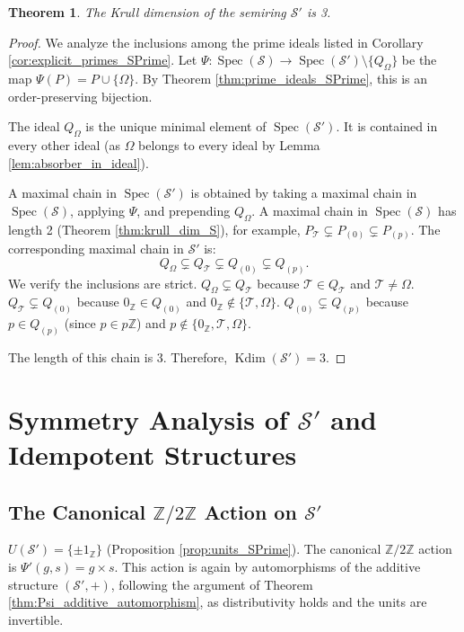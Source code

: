 \documentclass[11pt, a4paper]{article}
\theoremstyle{plain}
\newtheorem{theorem}{Theorem}[section]
\theoremstyle{definition}
\numberwithin{equation}{section}
\newcommand{\Z}{\mathbb{Z}}
\newcommand{\Tobj}{\mathcal{T}} %
\newcommand{\OmegaObj}{\Omega} %
\newcommand{\SemiringS}{\mathcal{S}}
\newcommand{\SemiringSPrime}{\mathcal{S}'}
\newcommand{\Ztwo}{\mathbb{Z}/2\mathbb{Z}}
\DeclareMathOperator{\Spec}{Spec}
\DeclareMathOperator{\KrullDim}{Kdim}
\begin{document}
\begin{theorem}\label{thm:krull_dim_SPrime}
The Krull dimension of the semiring $\SemiringSPrime$ is 3.
\end{theorem}
\begin{proof}
We analyze the inclusions among the prime ideals listed in Corollary \ref{cor:explicit_primes_SPrime}.
Let $\Psi: \Spec(\SemiringS) \to \Spec(\SemiringSPrime) \setminus \{Q_{\OmegaObj}\}$ be the map $\Psi(P) = P \cup \{\OmegaObj\}$. By Theorem \ref{thm:prime_ideals_SPrime}, this is an order-preserving bijection.

The ideal $Q_{\OmegaObj}$ is the unique minimal element of $\Spec(\SemiringSPrime)$. It is contained in every other ideal (as $\OmegaObj$ belongs to every ideal by Lemma \ref{lem:absorber_in_ideal}).

A maximal chain in $\Spec(\SemiringSPrime)$ is obtained by taking a maximal chain in $\Spec(\SemiringS)$, applying $\Psi$, and prepending $Q_{\OmegaObj}$.
A maximal chain in $\Spec(\SemiringS)$ has length 2 (Theorem \ref{thm:krull_dim_S}), for example, $P_{\Tobj} \subsetneq P_{(0)} \subsetneq P_{(p)}$.
The corresponding maximal chain in $\SemiringSPrime$ is:
\begin{equation}
    Q_{\OmegaObj} \subsetneq Q_{\Tobj} \subsetneq Q_{(0)} \subsetneq Q_{(p)}.
\end{equation}
We verify the inclusions are strict.
$Q_{\OmegaObj} \subsetneq Q_{\Tobj}$ because $\Tobj \in Q_{\Tobj}$ and $\Tobj \neq \OmegaObj$.
$Q_{\Tobj} \subsetneq Q_{(0)}$ because $0_{\Z} \in Q_{(0)}$ and $0_{\Z} \notin \{\Tobj, \OmegaObj\}$.
$Q_{(0)} \subsetneq Q_{(p)}$ because $p \in Q_{(p)}$ (since $p\in p\Z$) and $p \notin \{0_{\Z}, \Tobj, \OmegaObj\}$.

The length of this chain is 3. Therefore, $\KrullDim(\SemiringSPrime)=3$.
\end{proof}

\section{Symmetry Analysis of $\SemiringSPrime$ and Idempotent Structures}

\subsection{The Canonical $\Ztwo$ Action on $\SemiringSPrime$}

$U(\SemiringSPrime) = \{\pm 1_{\Z}\}$ (Proposition \ref{prop:units_SPrime}). The canonical $\Ztwo$ action is $\Psi'(g, s)=g\times s$. This action is again by automorphisms of the additive structure $(\SemiringSPrime, +)$, following the argument of Theorem \ref{thm:Psi_additive_automorphism}, as distributivity holds and the units are invertible.
\end{document}
